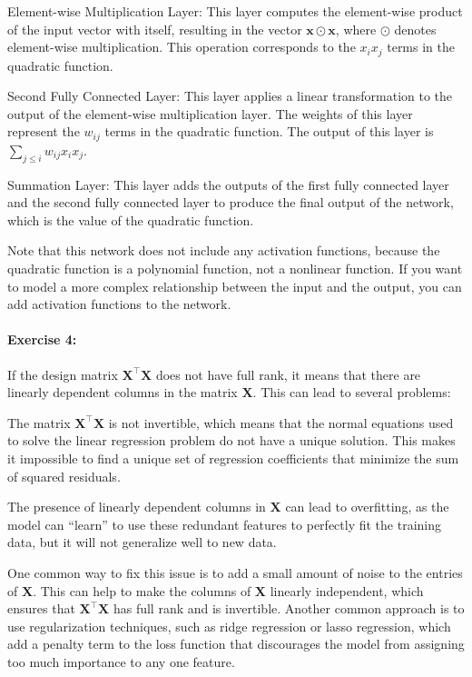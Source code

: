 Element-wise Multiplication Layer: This layer computes the element-wise product of the input vector with itself, resulting in the vector \(\mathbf{x} \odot \mathbf{x}\), where \(\odot\) denotes element-wise multiplication.
This operation corresponds to the \(x_i x_j\) terms in the quadratic function.

Second Fully Connected Layer: This layer applies a linear transformation to the output of the element-wise multiplication layer.
The weights of this layer represent the \(w_{ij}\) terms in the quadratic function. The output of this layer is \(\sum_{j \leq i} w_{ij} x_{i} x_{j}\).

Summation Layer: This layer adds the outputs of the first fully connected layer and the second fully connected layer to produce the final output of the network, which is the value of the quadratic function.

Note that this network does not include any activation functions, because the quadratic function is a polynomial function, not a nonlinear function.
If you want to model a more complex relationship between the input and the output, you can add activation functions to the network.

\paragraph{Exercise 4:}

If the design matrix \(\mathbf{X}^\top \mathbf{X}\) does not have full rank, it means that there are linearly dependent columns in the matrix \(\mathbf{X}\). This can lead to several problems:

The matrix \(\mathbf{X}^\top \mathbf{X}\) is not invertible, which means that the normal equations used to solve the linear regression problem do not have a unique solution.
This makes it impossible to find a unique set of regression coefficients that minimize the sum of squared residuals.

The presence of linearly dependent columns in \(\mathbf{X}\) can lead to overfitting, as the model can “learn” to use these redundant features to perfectly fit the training data, but it will not generalize well to new data.

One common way to fix this issue is to add a small amount of noise to the entries of \(\mathbf{X}\).
This can help to make the columns of \(\mathbf{X}\) linearly independent, which ensures that \(\mathbf{X}^\top \mathbf{X}\) has full rank and is invertible.
Another common approach is to use regularization techniques, such as ridge regression or lasso regression, which add a penalty term to the loss function that discourages the model from assigning too much importance to any one feature.

